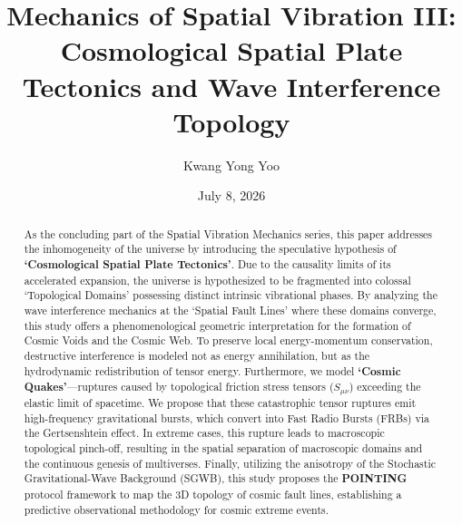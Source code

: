 \documentclass[reprint,amsmath,amssymb,aps,prd]{revtex4-2}
\begin{document}

\title{Mechanics of Spatial Vibration III: Cosmological Spatial Plate Tectonics and Wave Interference Topology}

\author{Kwang Yong Yoo}

\date{July 8, 2026}

\begin{abstract}
As the concluding part of the Spatial Vibration Mechanics series, this paper addresses the inhomogeneity of the universe by introducing the speculative hypothesis of \textbf{`Cosmological Spatial Plate Tectonics'}.
Due to the causality limits of its accelerated expansion, the universe is hypothesized to be fragmented into colossal `Topological Domains' possessing distinct intrinsic vibrational phases.
By analyzing the wave interference mechanics at the `Spatial Fault Lines' where these domains converge, this study offers a phenomenological geometric interpretation for the formation of Cosmic Voids and the Cosmic Web.
To preserve local energy-momentum conservation, destructive interference is modeled not as energy annihilation, but as the hydrodynamic redistribution of tensor energy.
Furthermore, we model \textbf{`Cosmic Quakes'}---ruptures caused by topological friction stress tensors ($S_{\mu\nu}$) exceeding the elastic limit of spacetime.
We propose that these catastrophic tensor ruptures emit high-frequency gravitational bursts, which convert into Fast Radio Bursts (FRBs) via the Gertsenshtein effect.
In extreme cases, this rupture leads to macroscopic topological pinch-off, resulting in the spatial separation of macroscopic domains and the continuous genesis of multiverses.
Finally, utilizing the anisotropy of the Stochastic Gravitational-Wave Background (SGWB), this study proposes the \textbf{POINTING} protocol framework to map the 3D topology of cosmic fault lines, establishing a predictive observational methodology for cosmic extreme events.
\end{abstract}

\maketitle
\end{document}
